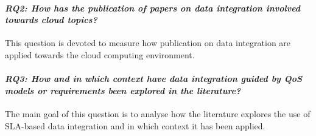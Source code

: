 \paragraph{ \textit{\textbf{RQ2:}  How has the publication of papers on data
 integration involved towards cloud topics?}} This question is devoted to
 measure how publication on data integration are applied towards the cloud computing
environment.

\paragraph{\textit{\textbf{RQ3:} How and in which context have data integration
guided by QoS models or requirements been explored in the literature?}} The main
goal of this question is to analyse how the literature explores the use of
SLA-based data integration and in which context it has been applied.




